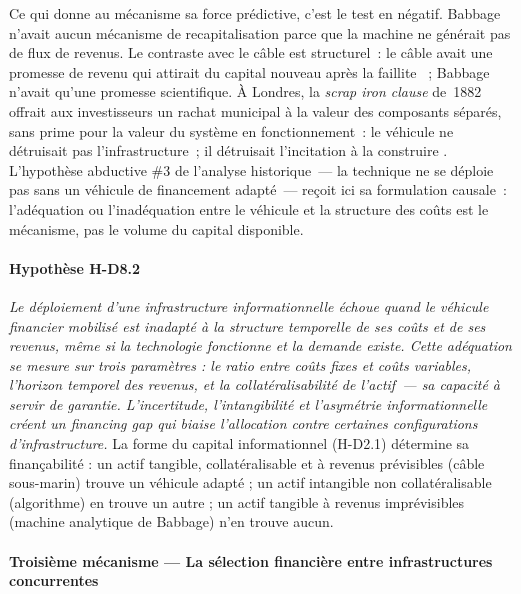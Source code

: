 Ce qui donne au mécanisme sa force prédictive, c'est le test en négatif. Babbage n'avait aucun mécanisme de recapitalisation parce que la machine ne générait pas de flux de revenus. Le contraste avec le câble est structurel~: le câble avait une promesse de revenu qui attirait du capital nouveau après la faillite \parencite{gordon_thread_2002}~; Babbage n'avait qu'une promesse scientifique. À Londres, la \emph{scrap iron clause} de~1882 offrait aux investisseurs un rachat municipal à la valeur des composants séparés, sans prime pour la valeur du système en fonctionnement~: le véhicule ne détruisait pas l'infrastructure~; il détruisait l'incitation à la construire \parencite{hughes_networks_1983}. L'hypothèse abductive \#3 de l'analyse historique~--- la technique ne se déploie pas sans un véhicule de financement adapté~--- reçoit ici sa formulation causale~: l'adéquation ou l'inadéquation entre le véhicule et la structure des coûts est le mécanisme, pas le volume du capital disponible.

\paragraph{Hypothèse H-D8.2} \emph{Le déploiement d'une infrastructure informationnelle échoue quand le véhicule financier mobilisé est inadapté à la structure temporelle de ses coûts et de ses revenus, même si la technologie fonctionne et la demande existe. Cette adéquation se mesure sur trois paramètres : le ratio entre coûts fixes et coûts variables, l'horizon temporel des revenus, et la collatéralisabilité de l'actif~--- sa capacité à servir de garantie. L'incertitude, l'intangibilité et l'asymétrie informationnelle créent un \emph{financing gap} \parencite{hall_financing_2010} qui biaise l'allocation contre certaines configurations d'infrastructure.} La forme du capital informationnel (H-D2.1) détermine sa finançabilité : un actif tangible, collatéralisable et à revenus prévisibles (câble sous-marin) trouve un véhicule adapté ; un actif intangible non collatéralisable (algorithme) en trouve un autre ; un actif tangible à revenus imprévisibles (machine analytique de Babbage) n'en trouve aucun.

\paragraph{Troisième mécanisme --- La sélection financière entre infrastructures concurrentes}

